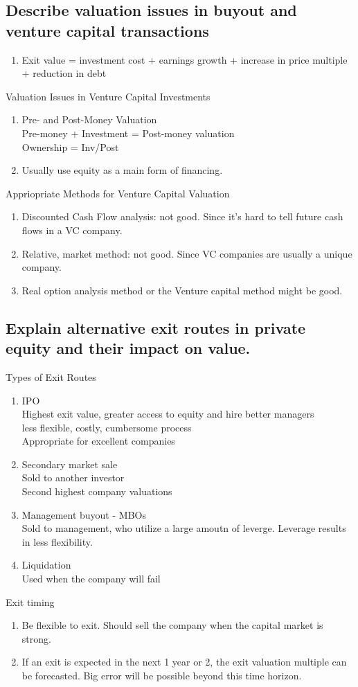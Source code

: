 \documentclass{article}
\newcommand{\be}{\begin{enumerate}}
\newcommand{\ee}{\end{enumerate}}
\begin{document}
\subsection{Describe valuation issues in buyout and venture capital transactions}
\be
    \item Exit value = investment cost + earnings growth + increase in price multiple + reduction in debt
\ee
Valuation Issues in Venture Capital Investments
\be
    \item Pre- and Post-Money Valuation
    \\ Pre-money + Investment = Post-money valuation
    \\ Ownership = Inv/Post
    \item Usually use equity as a main form of financing.
\ee
Appriopriate Methods for Venture Capital Valuation
\be
    \item Discounted Cash Flow analysis: not good. Since it's hard to tell future cash flows
    in a VC company.
    \item Relative, market method: not good. Since VC companies are usually a unique company.
    \item Real option analysis method or the Venture capital method might be good.
\ee
\subsection{Explain alternative exit routes in private equity and their impact on value.}
Types of Exit Routes
\be
    \item IPO
    \\Highest exit value, greater access to equity and hire better managers
    \\less flexible, costly, cumbersome process
    \\Appropriate for excellent companies
    \item Secondary market sale
    \\Sold to another investor
    \\Second highest company valuations
    \item Management buyout - MBOs
    \\ Sold to management, who utilize a large amoutn of leverge. Leverage results in less flexibility.
    \item Liquidation
    \\ Used when the company will fail
\ee
Exit timing
\be
    \item Be flexible to exit. Should sell the company when the capital market is strong.
    \item If an exit is expected in the next 1 year or 2, the exit valuation multiple can be forecasted.
    Big error will be possible beyond this time horizon.
\ee
\end{document}
